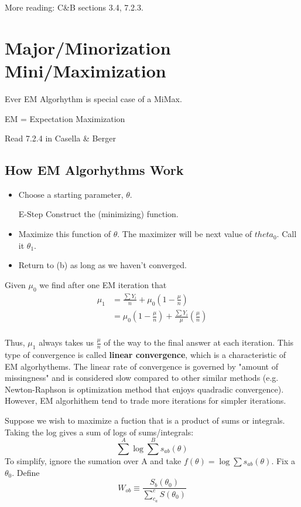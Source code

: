 \documentclass[11pt,fleqn]{book} %
\begin{document}
\begin{remark}
	More reading: C&B sections 3.4, 7.2.3.
\end{remark}

\section{Major/Minorization Mini/Maximization}

Ever EM Algorhythm is special case of a MiMax.

EM = Expectation Maximization

\begin{remark}
	Read 7.2.4 in Casella \& Berger
\end{remark}

\subsection{How EM Algorhythms Work}
\begin{itemize}
	\item Choose a starting parameter, $\theta$. 
	\item [E-Step] Construct the (minimizing) function.
	\item Maximize this function of $\theta$. The maximizer will be next value of $theta_0$. Call it $\theta_1$. 
	\item Return to (b) as long as we haven't converged.   
\end{itemize}

Given $\mu_0$ we find after one EM iteration that
\begin{align*}
\mu_1 &=\frac{\sum Y_i}{n}+\mu_0(1-\frac{\mu}{n})\\
&= \mu_0(1-\frac{\mu}{n})+\frac{\sum Y_i}{\mu}(\frac{\mu}{n})\\
\end{align*}

Thus, $\mu_1$ always takes us $\frac{\mu}{n}$ of the way to the final answer at each iteration. This type of convergence is called \textbf{linear convergence}, which is a characteristic of EM algorhythems. The linear rate of convergence is governed by "amount of missingness" and is considered slow compared to other similar methods (e.g. Newton-Raphson is optimization method that enjoys quadradic convergence). However, EM algorhithem tend to trade more iterations for simpler iterations. 

Suppose we wish to maximize a fuction that is a product of sums or integrals. Taking the log gives a sum of logs of sums/integrals:
$$\sum^A\log\sum^B s_{ab}(\theta)$$ 
To simplify, ignore the sumation over A and take $f(\theta) = \log \sum s_{ab}(\theta)$. Fix a $\theta_0$. Define
$$W_{ob} \equiv \frac{S_b(\theta_0)}{\sum^c_{c_a} S(\theta_0)} $$ 
\end{document}
